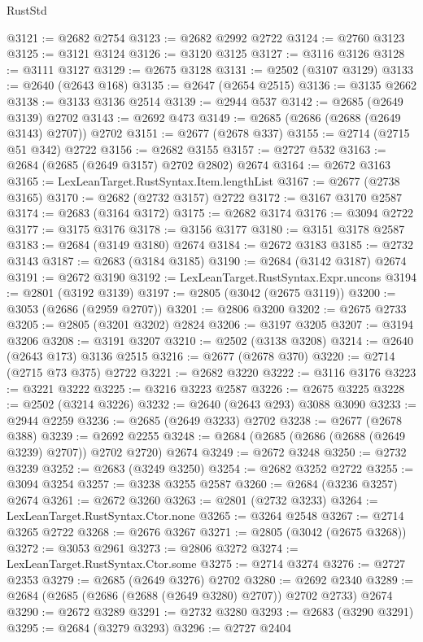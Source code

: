 \begin{lexlean}{RustStd}
\begin{coremodule}
{\begin{coremodule}
{{{{{{{{{{{{{{{{{{{{{{{{{{@3121 := @2682 @2754
@3123 := @2682 @2992 @2722
@3124 := @2760 @3123
@3125 := @3121 @3124
@3126 := @3120 @3125
@3127 := @3116 @3126
@3128 := @3111 @3127
@3129 := @2675 @3128
@3131 := @2502 (@3107 @3129)
@3133 := @2640 (@2643 @168)
@3135 := @2647 (@2654 @2515)
@3136 := @3135 @2662
@3138 := @3133 @3136 @2514
@3139 := @2944 @537
@3142 := @2685 (@2649 @3139) @2702
@3143 := @2692 @473
@3149 := @2685 (@2686 (@2688 (@2649 @3143) @2707)) @2702
@3151 := @2677 (@2678 @337)
@3155 := @2714 (@2715 @51 @342) @2722
@3156 := @2682 @3155
@3157 := @2727 @532
@3163 := @2684 (@2685 (@2649 @3157) @2702 @2802) @2674
@3164 := @2672 @3163
@3165 := LexLeanTarget.RustSyntax.Item.lengthList
@3167 := @2677 (@2738 @3165)
@3170 := @2682 (@2732 @3157) @2722
@3172 := @3167 @3170 @2587
@3174 := @2683 (@3164 @3172)
@3175 := @2682 @3174
@3176 := @3094 @2722
@3177 := @3175 @3176
@3178 := @3156 @3177
@3180 := @3151 @3178 @2587
@3183 := @2684 (@3149 @3180) @2674
@3184 := @2672 @3183
@3185 := @2732 @3143
@3187 := @2683 (@3184 @3185)
@3190 := @2684 (@3142 @3187) @2674
@3191 := @2672 @3190
@3192 := LexLeanTarget.RustSyntax.Expr.uncons
@3194 := @2801 (@3192 @3139)
@3197 := @2805 (@3042 (@2675 @3119))
@3200 := @3053 (@2686 (@2959 @2707))
@3201 := @2806 @3200
@3202 := @2675 @2733
@3205 := @2805 (@3201 @3202) @2824
@3206 := @3197 @3205
@3207 := @3194 @3206
@3208 := @3191 @3207
@3210 := @2502 (@3138 @3208)
@3214 := @2640 (@2643 @173) @3136 @2515
@3216 := @2677 (@2678 @370)
@3220 := @2714 (@2715 @73 @375) @2722
@3221 := @2682 @3220
@3222 := @3116 @3176
@3223 := @3221 @3222
@3225 := @3216 @3223 @2587
@3226 := @2675 @3225
@3228 := @2502 (@3214 @3226)
@3232 := @2640 (@2643 @293) @3088 @3090
@3233 := @2944 @2259
@3236 := @2685 (@2649 @3233) @2702
@3238 := @2677 (@2678 @388)
@3239 := @2692 @2255
@3248 := @2684 (@2685 (@2686 (@2688 (@2649 @3239) @2707)) @2702 @2720) @2674
@3249 := @2672 @3248
@3250 := @2732 @3239
@3252 := @2683 (@3249 @3250)
@3254 := @2682 @3252 @2722
@3255 := @3094 @3254
@3257 := @3238 @3255 @2587
@3260 := @2684 (@3236 @3257) @2674
@3261 := @2672 @3260
@3263 := @2801 (@2732 @3233)
@3264 := LexLeanTarget.RustSyntax.Ctor.none
@3265 := @3264 @2548
@3267 := @2714 @3265 @2722
@3268 := @2676 @3267
@3271 := @2805 (@3042 (@2675 @3268))
@3272 := @3053 @2961
@3273 := @2806 @3272
@3274 := LexLeanTarget.RustSyntax.Ctor.some
@3275 := @2714 @3274
@3276 := @2727 @2353
@3279 := @2685 (@2649 @3276) @2702
@3280 := @2692 @2340
@3289 := @2684 (@2685 (@2686 (@2688 (@2649 @3280) @2707)) @2702 @2733) @2674
@3290 := @2672 @3289
@3291 := @2732 @3280
@3293 := @2683 (@3290 @3291)
@3295 := @2684 (@3279 @3293)
@3296 := @2727 @2404
}}}}}}}}}}}}}}}}}}}}}}}}}}
\end{coremodule}}
\end{coremodule}
\end{lexlean}
